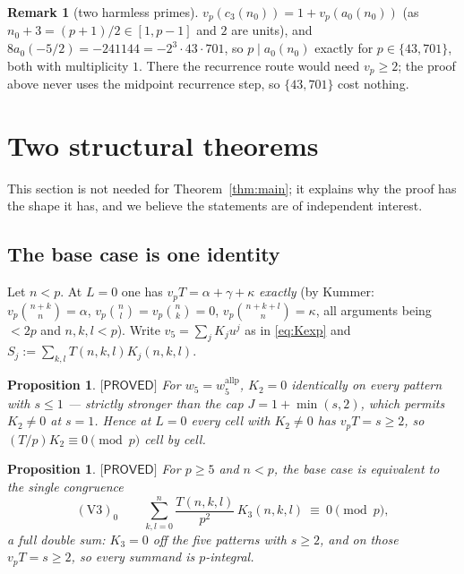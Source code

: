 \documentclass[11pt,reqno]{amsart}
\theoremstyle{plain}
\newtheorem{proposition}[theorem]{Proposition}
\theoremstyle{definition}
\newtheorem{remark}[theorem]{Remark}
\theoremstyle{remark}
\numberwithin{equation}{section}
\newcommand{\wfive}{w_5}
\newcommand{\vfive}{v_5}
\newcommand{\PROVED}{\textsf{[PROVED]}}
\begin{document}
\begin{remark}[two harmless primes]
$v_p(c_3(n_0))=1+v_p(a_0(n_0))$ (as $n_0+3=(p+1)/2\in[1,p-1]$ and $2$ are units), and
$8a_0(-5/2)=-241144=-2^3\cdot43\cdot701$, so $p\mid a_0(n_0)$ exactly for $p\in\{43,701\}$,
both with multiplicity $1$. There the recurrence route would need $v_p\ge2$; the proof above
never uses the midpoint recurrence step, so $\{43,701\}$ cost nothing.
\end{remark}

\section{Two structural theorems}\label{sec:wall}

This section is not needed for Theorem~\ref{thm:main}; it explains why the proof has the shape
it has, and we believe the statements are of independent interest.

\subsection{The base case is one identity}

Let $n<p$. At $L=0$ one has $v_pT=\alpha+\gamma+\kappa$ \emph{exactly} (by Kummer:
$v_p\binom{n+k}{n}=\alpha$, $v_p\binom nl=v_p\binom nk=0$, $v_p\binom{n+k+l}{n}=\kappa$, all
arguments being $<2p$ and $n,k,l<p$). Write $\vfive=\sum_jK_ju^j$ as in \eqref{eq:Kexp} and
$S_j:=\sum_{k,l}T(n,k,l)K_j(n,k,l)$.

\begin{proposition}\label{prop:V2vac}
$\PROVED$ For $\wfive=w_5^{\mathrm{allp}}$, $K_2=0$ identically on every pattern with $s\le1$ ---
strictly stronger than the cap $J=1+\min(s,2)$, which permits $K_2\ne0$ at $s=1$. Hence at
$L=0$ every cell with $K_2\ne0$ has $v_pT=s\ge2$, so $(T/p)K_2\equiv0\pmod p$ cell by cell.
\end{proposition}

\begin{proposition}\label{prop:V3}
$\PROVED$ For $p\ge5$ and $n<p$, the base case is \emph{equivalent} to the single congruence
\[
(\mathrm V3)_0\qquad \sum_{k,l=0}^{n}\frac{T(n,k,l)}{p^2}\,K_3(n,k,l)\ \equiv\ 0\pmod p,
\]
a \emph{full} double sum: $K_3=0$ off the five patterns with $s\ge2$, and on those $v_pT=s\ge2$,
so every summand is $p$-integral.
\end{proposition}
\end{document}
